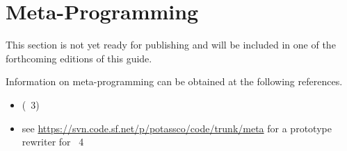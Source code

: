 \section{Meta-Programming}\label{sec:meta}

This section is not yet ready for publishing
and will be included in one of the forthcoming editions of this guide.

Information on meta-programming can be obtained at the following references.

\begin{itemize}
\item \cite{gekasc11b} (\gringo\ 3)
\item see \url{https://svn.code.sf.net/p/potassco/code/trunk/meta} for a prototype rewriter for \gringo\ 4
\end{itemize}

